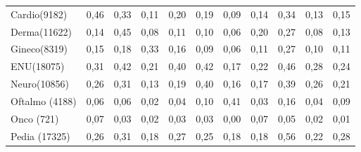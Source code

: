 \begin{table}[htb]
{\begin{tabular}{@{}lllllllllll@{}}
Cardio(9182)                                         & 0,46                  & 0,33                 & 0,11                  & 0,20               & 0,19                 & 0,09                   & 0,14                & 0,34                 & 0,13                   & 0,15                \\
Derma(11622)                                         & 0,14                  & 0,45                 & 0,08                  & 0,11               & 0,10                 & 0,06                   & 0,20                & 0,27                 & 0,08                   & 0,13                \\
Gineco(8319)                                         & 0,15                  & 0,18                 & 0,33                  & 0,16               & 0,09                 & 0,06                   & 0,11                & 0,27                 & 0,10                   & 0,11                \\
ENU(18075)                                           & 0,31                  & 0,42                 & 0,21                  & 0,40               & 0,42                 & 0,17                   & 0,22                & 0,46                 & 0,28                   & 0,24                \\
Neuro(10856)                                         & 0,26                  & 0,31                 & 0,13                  & 0,19               & 0,40                 & 0,16                   & 0,17                & 0,39                 & 0,26                   & 0,21                \\
Oftalmo (4188)                                       & 0,06                  & 0,06                 & 0,02                  & 0,04               & 0,10                 & 0,41                   & 0,03                & 0,16                 & 0,04                   & 0,09                \\
Onco (721)                                           & 0,07                  & 0,03                 & 0,02                  & 0,03               & 0,03                 & 0,00                   & 0,07                & 0,05                 & 0,02                   & 0,01                \\
Pedia (17325)                                        & 0,26                  & 0,31                 & 0,18                  & 0,27               & 0,25                 & 0,18                   & 0,18                & 0,56                 & 0,22                   & 0,28                \\

\end{tabular}}
\end{table}
